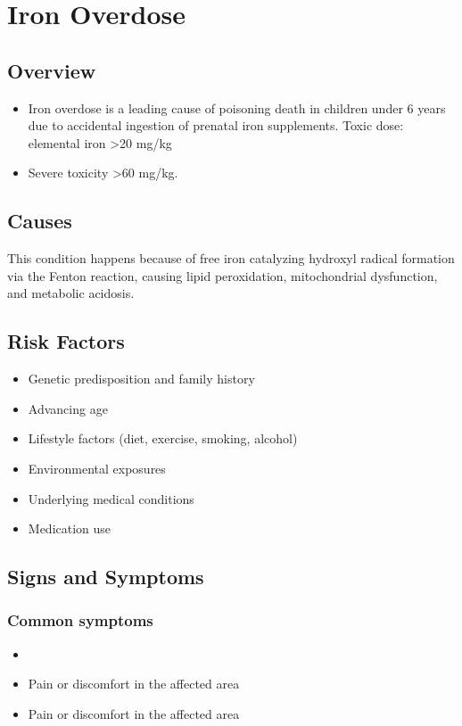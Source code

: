 \chapter{Iron Overdose}
\label{sec:Iron Overdose}

\section{Overview}


\begin{itemize}[noitemsep]
  \item Iron overdose is a leading cause of poisoning death in children under 6 years due to accidental ingestion of prenatal iron supplements. Toxic dose: elemental iron >20 mg/kg
  \item Severe toxicity >60 mg/kg.
\end{itemize}
\section{Causes}
This condition happens because of free iron catalyzing hydroxyl radical formation via the Fenton reaction, causing lipid peroxidation, mitochondrial dysfunction, and metabolic acidosis.     
\section{Risk Factors}

\begin{itemize}[noitemsep]
  \item Genetic predisposition and family history
  \item Advancing age
  \item Lifestyle factors (diet, exercise, smoking, alcohol)
  \item Environmental exposures
  \item Underlying medical conditions
  \item Medication use
\end{itemize}
\section{Signs and Symptoms}

\subsection{Common symptoms}
\begin{itemize}[noitemsep]
  \item \item Pain or discomfort in the affected area    \item Pain or discomfort in the affected area
  \end{itemize}


